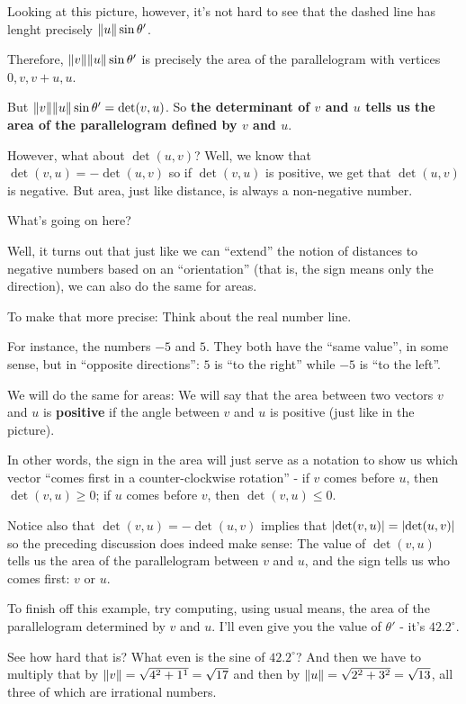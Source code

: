 \begin{ex}
	Looking at this picture, however, it's not hard to see that the dashed line has lenght precisely $\lVert u\rVert\sin\theta'$.
	
	Therefore, $\lVert v\rVert\lVert u\rVert\sin\theta'$ is precisely the area of the parallelogram with vertices $0,v,v+u,u$.
	
	But $\lVert v\rVert\lVert u\rVert\sin\theta'=\det(v,u)$. So \textbf{the determinant of $v$ and $u$ tells us the area of the parallelogram defined by $v$ and $u$}.
	
	\bigskip
	However, what about $\det(u,v)$? Well, we know that $\det(v,u)=-\det(u,v)$ so if $\det(v,u)$ is positive, we get that $\det(u,v)$ is negative. But area, just like distance, is always a non-negative number.
	
	What's going on here?
	
	Well, it turns out that just like we can ``extend'' the notion of distances to negative numbers based on an ``orientation'' (that is, the sign means only the direction), we can also do the same for areas.
	
	To make that more precise: Think about the real number line.
	
	For instance, the numbers $-5$ and $5$. They both have the ``same value'', in some sense, but in ``opposite directions'': $5$ is ``to the right'' while $-5$ is ``to the left''.
	
	We will do the same for areas: We will say that the area between two vectors $v$ and $u$ is \textbf{positive} if the angle between $v$ and $u$ is positive (just like in the picture).
	
	In other words, the sign in the area will just serve as a notation to show us which vector ``comes first in a counter-clockwise rotation'' - if $v$ comes before $u$, then $\det(v,u)\geq 0$; if $u$ comes before $v$, then $\det(v,u)\leq 0$.
	
	Notice also that $\det(v,u)=-\det(u,v)$ implies that $\left\vert\det(v,u)\right\vert=\left\vert\det(u,v)\right\vert$ so the preceding discussion does indeed make sense: The value of $\det(v,u)$ tells us the area of the parallelogram between $v$ and $u$, and the sign tells us who comes first: $v$ or $u$.
	
	\bigskip
	To finish off this example, try computing, using usual means, the area of the parallelogram determined by $v$ and $u$. I'll even give you the value of $\theta'$ - it's $42.2^\circ$.
	
	See how hard that is? What even is the sine of $42.2^\circ$? And then we have to multiply that by $\lVert v\rVert=\sqrt{4^2+1^1}=\sqrt{17}$ and then by $\lVert u\rVert=\sqrt{2^2+3^2}=\sqrt{13}$, all three of which are irrational numbers.
	

\end{ex}
